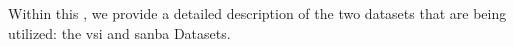 \label{datasets}

Within this \headerName{}, we provide a detailed description of the two datasets that are being utilized: the \gls{vsi} and \gls{sanba} Datasets.



\newpage